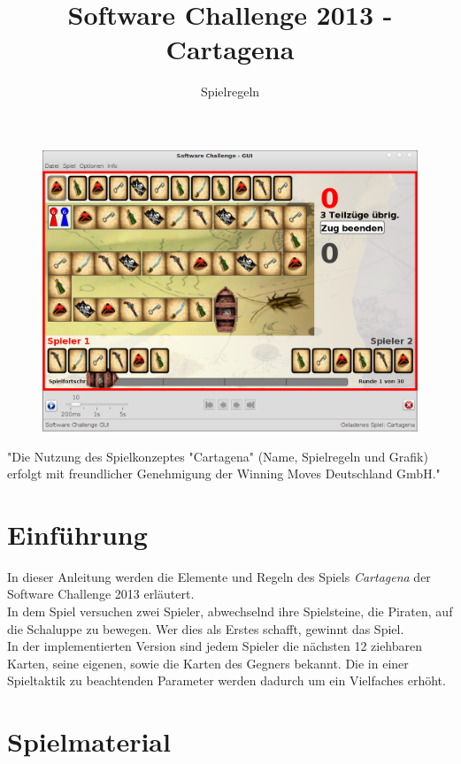 \documentclass[a4paper, ngerman]{scrartcl}
\title{Software Challenge 2013 - Cartagena}
\subtitle{Spielregeln}
\begin{document}
\maketitle

\begin{figure}[h]
	\centering
	\includegraphics[width=\linewidth]{bilder/Uebersicht.png}
\end{figure}
\vspace*{\fill}
"Die Nutzung des Spielkonzeptes "Cartagena" (Name, Spielregeln und Grafik)
erfolgt mit freundlicher Genehmigung der Winning Moves Deutschland GmbH."
\newpage
\tableofcontents
\newpage

\section{Einführung}
In dieser Anleitung werden die Elemente und Regeln des Spiels \emph{Cartagena}
der Software Challenge 2013 erläutert.\\
In dem Spiel versuchen zwei Spieler,
abwechselnd ihre Spielsteine, die Piraten, auf die Schaluppe zu bewegen. Wer
dies als Erstes schafft, gewinnt das Spiel.\\
In der implementierten Version sind jedem Spieler die nächsten 12 ziehbaren
Karten, seine eigenen, sowie die Karten des Gegners bekannt. Die
in einer Spieltaktik zu beachtenden Parameter werden dadurch um ein Vielfaches
erhöht.

\section{Spielmaterial}
\end{document}
